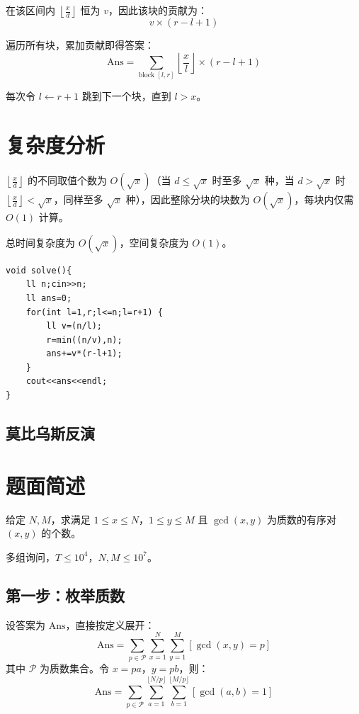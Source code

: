 \documentclass[11pt,a4paper,twocolumn]{ctexart}  %
\begin{document}
在该区间内 $\left\lfloor \frac{x}{d} \right\rfloor$ 恒为 $v$，因此该块的贡献为：
\[
    v \times (r - l + 1)
\]

遍历所有块，累加贡献即得答案：
\[
    \mathrm{Ans} = \sum_{\text{block } [l,r]} \left\lfloor \frac{x}{l} \right\rfloor \times (r - l + 1)
\]

每次令 $l \leftarrow r + 1$ 跳到下一个块，直到 $l > x$。

\section*{复杂度分析}

$\left\lfloor \frac{x}{d} \right\rfloor$ 的不同取值个数为 $O(\sqrt{x})$（当 $d \le \sqrt{x}$ 时至多 $\sqrt{x}$ 种，当 $d > \sqrt{x}$ 时 $\left\lfloor \frac{x}{d} \right\rfloor < \sqrt{x}$，同样至多 $\sqrt{x}$ 种），因此整除分块的块数为 $O(\sqrt{x})$，每块内仅需 $O(1)$ 计算。

总时间复杂度为 $O(\sqrt{x})$，空间复杂度为 $O(1)$。
\begin{lstlisting}[caption={整除分块},label={整除分块}]
void solve(){
    ll n;cin>>n;
    ll ans=0;
    for(int l=1,r;l<=n;l=r+1) {
        ll v=(n/l);
        r=min((n/v),n);
        ans+=v*(r-l+1);
    }
    cout<<ans<<endl;
}
\end{lstlisting}

\subsection{莫比乌斯反演}
\section*{题面简述}

给定 $N, M$，求满足 $1 \le x \le N$，$1 \le y \le M$ 且 $\gcd(x, y)$ 为质数的有序对 $(x, y)$ 的个数。

多组询问，$T \le 10^4$，$N, M \le 10^7$。


\subsection*{第一步：枚举质数}

设答案为 $\mathrm{Ans}$，直接按定义展开：
\[
    \mathrm{Ans} = \sum_{p \in \mathcal{P}} \sum_{x=1}^{N} \sum_{y=1}^{M} [\gcd(x, y) = p]
\]
其中 $\mathcal{P}$ 为质数集合。令 $x = pa$，$y = pb$，则：
\[
    \mathrm{Ans} = \sum_{p \in \mathcal{P}} \sum_{a=1}^{\lfloor N/p \rfloor} \sum_{b=1}^{\lfloor M/p \rfloor} [\gcd(a, b) = 1]
\]
\end{document}
